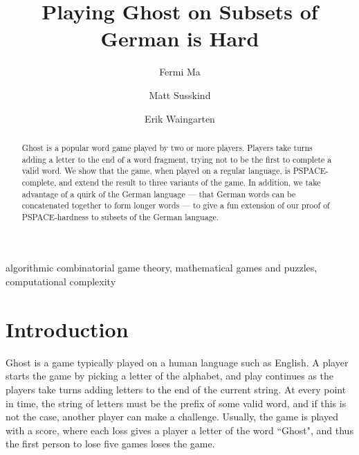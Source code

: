 \documentclass[runningheads,a4paper]{llncs}
\newcommand{\keywords}[1]{\par\addvspace\baselineskip
\noindent\keywordname\enspace\ignorespaces#1}
\begin{document}
\mainmatter  

\title{Playing Ghost on Subsets of German is Hard}


\author{Fermi Ma
\and Matt Susskind \and Erik Waingarten}
%


%
%

\maketitle


\begin{abstract}

Ghost is a popular word game played by two or more players. Players take turns adding a letter to the end of a word fragment, trying not to be the first to complete a valid word. We show that the game, when played on a regular language, is PSPACE-complete, and extend the result to three variants of the game. In addition, we take advantage of a quirk of the German language --- that German words can be concatenated together to form longer words --- to give a fun extension of our proof of PSPACE-hardness to subsets of the German language. 
\end{abstract}

\keywords{algorithmic combinatorial game theory, mathematical games and puzzles, computational complexity}

\section{Introduction}

	Ghost is a game typically played on a human language such as English. A player starts the game by picking a letter of the alphabet, and play continues as the players take turns adding letters to the end of the current string. At every point in time, the string of letters must be the prefix of some valid word, and if this is not the case, another player can make a challenge. Usually, the game is played with a score, where each loss gives a player a letter of the word ``Ghost", and thus the first person to lose five games loses the game.
\end{document}
